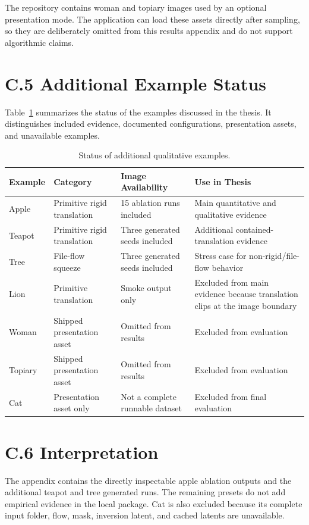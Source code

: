The repository contains woman and topiary images used by an optional presentation mode. The application can load these assets directly after sampling, so they are deliberately omitted from this results appendix and do not support algorithmic claims.

\section*{C.5 Additional Example Status}

Table~\ref{tab:appendix-result-status} summarizes the status of the examples discussed in the thesis. It distinguishes included evidence, documented configurations, presentation assets, and unavailable examples.

\begin{table}[p]
  \centering
  \scriptsize
  \caption{Status of additional qualitative examples.}
  \label{tab:appendix-result-status}
  \renewcommand{\arraystretch}{1.15}
  \begin{tabular}{p{0.85in}|p{1.15in}|p{1.4in}|p{1.75in}}
    \hline
    \textbf{Example} & \textbf{Category} & \textbf{Image Availability} & \textbf{Use in Thesis} \\ \hline \hline
    Apple & Primitive rigid translation & 15 ablation runs included & Main quantitative and qualitative evidence \\ \hline
    Teapot & Primitive rigid translation & Three generated seeds included & Additional contained-translation evidence \\ \hline
    Tree & File-flow squeeze & Three generated seeds included & Stress case for non-rigid/file-flow behavior \\ \hline
    Lion & Primitive translation & Smoke output only & Excluded from main evidence because translation clips at the image boundary \\ \hline
    Woman & Shipped presentation asset & Omitted from results & Excluded from evaluation \\ \hline
    Topiary & Shipped presentation asset & Omitted from results & Excluded from evaluation \\ \hline
    Cat & Presentation asset only & Not a complete runnable dataset & Excluded from final evaluation \\ \hline
  \end{tabular}
\end{table}

\section*{C.6 Interpretation}

The appendix contains the directly inspectable apple ablation outputs and the additional teapot and tree generated runs. The remaining presets do not add empirical evidence in the local package. Cat is also excluded because its complete input folder, flow, mask, inversion latent, and cached latents are unavailable.
